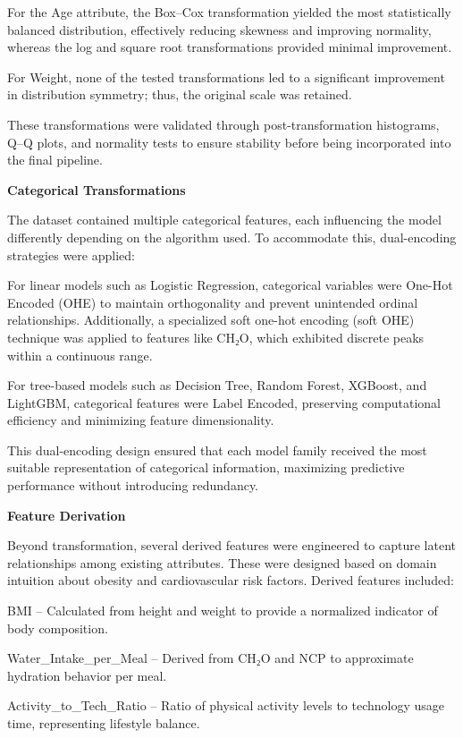 For the Age attribute, the Box–Cox transformation yielded the most statistically balanced distribution, effectively reducing skewness and improving normality, whereas the log and square root transformations provided minimal improvement.

For Weight, none of the tested transformations led to a significant improvement in distribution symmetry; thus, the original scale was retained.

These transformations were validated through post-transformation histograms, Q–Q plots, and normality tests to ensure stability before being incorporated into the final pipeline.

\textbf{Categorical Transformations}

The dataset contained multiple categorical features, each influencing the model differently depending on the algorithm used.
To accommodate this, dual-encoding strategies were applied:

For linear models such as Logistic Regression, categorical variables were One-Hot Encoded (OHE) to maintain orthogonality and prevent unintended ordinal relationships.
Additionally, a specialized soft one-hot encoding (soft OHE) technique was applied to features like CH₂O, which exhibited discrete peaks within a continuous range.

For tree-based models such as Decision Tree, Random Forest, XGBoost, and LightGBM, categorical features were Label Encoded, preserving computational efficiency and minimizing feature dimensionality.

This dual-encoding design ensured that each model family received the most suitable representation of categorical information, maximizing predictive performance without introducing redundancy.

\textbf{Feature Derivation}

Beyond transformation, several derived features were engineered to capture latent relationships among existing attributes.
These were designed based on domain intuition about obesity and cardiovascular risk factors.
Derived features included:

BMI – Calculated from height and weight to provide a normalized indicator of body composition.

Water\_Intake\_per\_Meal – Derived from CH₂O and NCP to approximate hydration behavior per meal.

Activity\_to\_Tech\_Ratio – Ratio of physical activity levels to technology usage time, representing lifestyle balance.

